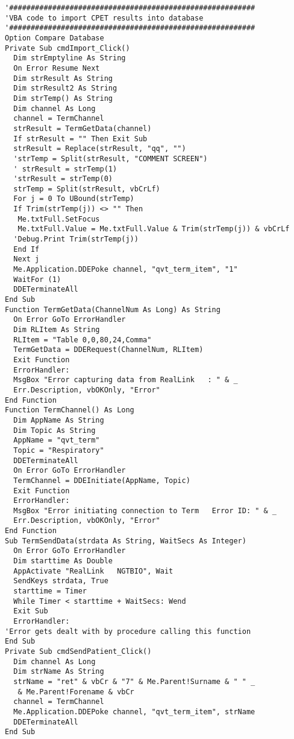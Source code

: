 \begin{lstlisting}
'#########################################################
'VBA code to import CPET results into database
'#########################################################
Option Compare Database
Private Sub cmdImport_Click()
  Dim strEmptyline As String
  On Error Resume Next
  Dim strResult As String
  Dim strResult2 As String
  Dim strTemp() As String
  Dim channel As Long
  channel = TermChannel
  strResult = TermGetData(channel)
  If strResult = "" Then Exit Sub
  strResult = Replace(strResult, "qq", "")
  'strTemp = Split(strResult, "COMMENT SCREEN")
  ' strResult = strTemp(1)
  'strResult = strTemp(0)
  strTemp = Split(strResult, vbCrLf)
  For j = 0 To UBound(strTemp)
  If Trim(strTemp(j)) <> "" Then
   Me.txtFull.SetFocus
   Me.txtFull.Value = Me.txtFull.Value & Trim(strTemp(j)) & vbCrLf
  'Debug.Print Trim(strTemp(j))
  End If
  Next j
  Me.Application.DDEPoke channel, "qvt_term_item", "1"
  WaitFor (1)
  DDETerminateAll
End Sub
Function TermGetData(ChannelNum As Long) As String
  On Error GoTo ErrorHandler
  Dim RLItem As String
  RLItem = "Table 0,0,80,24,Comma"
  TermGetData = DDERequest(ChannelNum, RLItem)
  Exit Function
  ErrorHandler:
  MsgBox "Error capturing data from RealLink   : " & _
  Err.Description, vbOKOnly, "Error"
End Function
Function TermChannel() As Long
  Dim AppName As String
  Dim Topic As String
  AppName = "qvt_term"
  Topic = "Respiratory"
  DDETerminateAll
  On Error GoTo ErrorHandler
  TermChannel = DDEInitiate(AppName, Topic)
  Exit Function
  ErrorHandler:
  MsgBox "Error initiating connection to Term   Error ID: " & _
  Err.Description, vbOKOnly, "Error"
End Function
Sub TermSendData(strdata As String, WaitSecs As Integer)
  On Error GoTo ErrorHandler
  Dim starttime As Double
  AppActivate "RealLink   NGTBIO", Wait
  SendKeys strdata, True
  starttime = Timer
  While Timer < starttime + WaitSecs: Wend
  Exit Sub
  ErrorHandler:
'Error gets dealt with by procedure calling this function
End Sub
Private Sub cmdSendPatient_Click()
  Dim channel As Long
  Dim strName As String
  strName = "ret" & vbCr & "7" & Me.Parent!Surname & " " _
   & Me.Parent!Forename & vbCr
  channel = TermChannel
  Me.Application.DDEPoke channel, "qvt_term_item", strName
  DDETerminateAll
End Sub
\end{lstlisting}

